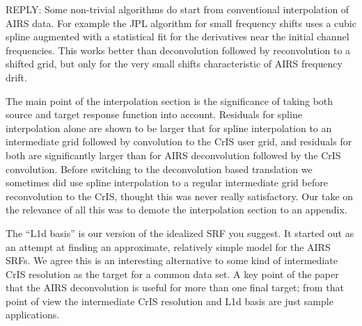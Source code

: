 \documentclass[11pt]{article}
\newcommand {\reply} {\mbox{\small REPLY}}
\begin{document}
\begin{itemize}
  \reply: Some non-trivial algorithms do start from conventional
  interpolation of AIRS data.  For example the JPL algorithm for
  small frequency shifts uses a cubic spline augmented with a
  statistical fit for the derivatives near the initial channel
  frequencies.  This works better than deconvolution followed by
  reconvolution to a shifted grid, but only for the very small
  shifts characteristic of AIRS frequency drift.

  The main point of the interpolation section is the significance 
  of taking both source and target response function into account.
  Residuals for spline interpolation alone are shown to be larger
  that for spline interpolation to an intermediate grid followed by
  convolution to the CrIS user grid, and residuals for both are
  significantly larger than for AIRS deconvolution followed by the
  CrIS convolution.  Before switching to the deconvolution based
  translation we sometimes did use spline interpolation to a regular
  intermediate grid before reconvolution to the CrIS, thought this
  was never really satisfactory.  Our take on the relevance of all
  this was to demote the interpolation section to an appendix.
  
  The ``L1d basis'' is our version of the idealized SRF you suggest.
  It started out as an attempt at finding an approximate, relatively
  simple model for the AIRS SRFs.  We agree this is an interesting
  alternative to some kind of intermediate CrIS resolution as the
  target for a common data set.  A key point of the paper that the
  AIRS deconvolution is useful for more than one final target; from
  that point of view the intermediate CrIS resolution and L1d basis
  are just sample applications.

\end{itemize}
\end{document}

